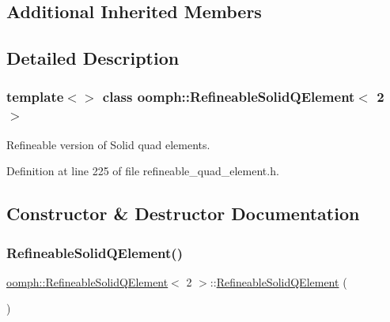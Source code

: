 \subsection*{Additional Inherited Members}


\subsection{Detailed Description}
\subsubsection*{template$<$$>$\newline
class oomph\+::\+Refineable\+Solid\+Q\+Element$<$ 2 $>$}

Refineable version of Solid quad elements. 

Definition at line 225 of file refineable\+\_\+quad\+\_\+element.\+h.



\subsection{Constructor \& Destructor Documentation}
\mbox{\label{classoomph_1_1RefineableSolidQElement_3_012_01_4_a9b7ebf008ab9c2eed649dd9bf67a68db}} 
\subsubsection{\texorpdfstring{Refineable\+Solid\+Q\+Element()}{RefineableSolidQElement()}\hspace{0.1cm}{\footnotesize\ttfamily [1/2]}}
{\footnotesize\ttfamily \hyperlink{classoomph_1_1RefineableSolidQElement}{oomph\+::\+Refineable\+Solid\+Q\+Element}$<$ 2 $>$\+::\hyperlink{classoomph_1_1RefineableSolidQElement}{Refineable\+Solid\+Q\+Element} (\begin{DoxyParamCaption}{ }\end{DoxyParamCaption})\hspace{0.3cm}{\ttfamily [inline]}}



